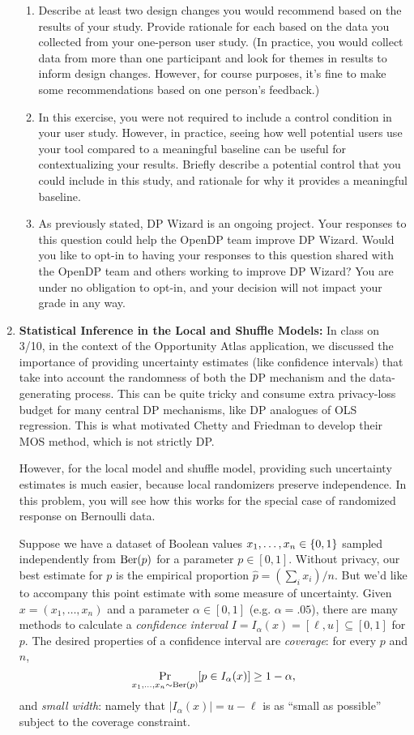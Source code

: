 \documentclass[11pt]{article}
\begin{document}
\begin{enumerate}[leftmargin=*]
\begin{enumerate}
    \item Describe at least two design changes you would recommend based on the results of your study. Provide rationale for each based on the data you collected from your one-person user study. (In practice, you would collect data from more than one participant and look for themes in results to inform design changes. However, for course purposes, it’s fine to make some recommendations based on one person’s feedback.)

    \item In this exercise, you were not required to include a control condition in your user study. However, in practice, seeing how well potential users use your tool compared to a meaningful baseline can be useful for contextualizing your results. Briefly describe a potential control that you could include in this study, and rationale for why it provides a meaningful baseline.

    \item As previously stated, DP Wizard is an ongoing project. Your responses to this question could help the OpenDP team improve DP Wizard. Would you like to opt-in to having your responses to this question shared with the OpenDP team and others working to improve DP Wizard? You are under no obligation to opt-in, and your decision will not impact your grade in any way.
\end{enumerate}


\item \textbf{Statistical Inference in the Local and Shuffle Models:}
In class on 3/10, in the context of the Opportunity Atlas application, we discussed the importance of providing uncertainty estimates (like confidence intervals) that take into account the randomness of both the DP mechanism and the data-generating process.  This can be quite tricky and consume extra privacy-loss budget for many central DP mechanisms, like DP analogues of OLS regression.  This is what motivated Chetty and Friedman to develop their MOS method, which is not strictly DP.

However, for the local model and shuffle model, providing such uncertainty estimates is much easier, because local randomizers preserve independence.  In this problem, you will see how this works for the special case of randomized response on Bernoulli data.

Suppose we have a dataset of Boolean values $x_1,\ldots,x_n\in \{0,1\}$ sampled independently from 
$\mathrm{Ber}(p)$ for a parameter $p\in [0,1].$  Without privacy, our best estimate for $p$ is the empirical proportion $\hat{p} = (\sum_i x_i)/n$.  But we'd like to accompany this point estimate with some measure of uncertainty.
Given $x=(x_1,\ldots,x_n)$ and a parameter $\alpha\in [0,1]$ (e.g. $\alpha=.05$), there are many methods to calculate a {\em confidence interval} $I=I_\alpha(x)=[\ell,u]\subseteq [0,1]$ for $p$.  The desired properties of a confidence interval are {\em coverage}: for every $p$ and $n$, 
$$\Pr_{x_1,\ldots,x_n\sim \mathrm{Ber}(p)}[p\in I_\alpha(x)] \geq 1-\alpha,$$
and {\em small width}: namely that $|I_\alpha(x)|=u-\ell$ is as ``small as possible'' subject to the coverage constraint.


\end{enumerate}
\end{document}

